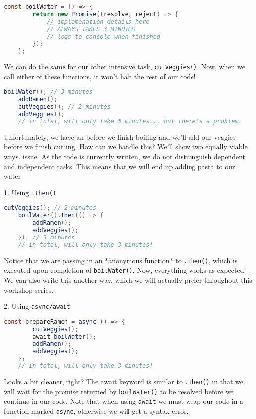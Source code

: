 \begin{lstlisting}[language=Java] 
    const boilWater = () => {
        return new Promise((resolve, reject) => {
            // implemenation details here
            // ALWAYS TAKES 3 MINUTES
            // logs to console when finished
        });        
    };
\end{lstlisting}

We can do the same for our other intensive task, \texttt{cutVeggies()}. Now, when we call either of these functions, it won't halt the rest of our code!

\begin{lstlisting}[language=Java] 
    boilWater(); // 3 minutes
    addRamen();
    cutVeggies(); // 2 minutes
    addVeggies();
    // in total, will only take 3 minutes... but there's a problem.
\end{lstlisting}

Unfortunately, we have an before we finish boiling and we'll add our veggies before we finish cutting. How can we handle this? We'll show two equally viable ways. issue. As the code is currently written, we do not distuinguish dependent and independent tasks. This means that we will end up adding pasta to our water


1. Using \texttt{.then()}
\begin{lstlisting}[language=Java] 
    cutVeggies(); // 2 minutes
    boilWater().then(() => {
        addRamen();
        addVeggies();
    }); // 3 minutes
    // in total, will only take 3 minutes!
\end{lstlisting}

Notice that we are passing in an *anonymous function* to \texttt{.then()}, which is executed upon completion of \texttt{boilWater()}. Now, everything works as expected. We can also write this another way, which we will actually prefer throughout this workshop series.
    
2. Using \texttt{async/await}
\begin{lstlisting}[language=Java] 
    const prepareRamen = async () => {
        cutVeggies();
        await boilWater();
        addRamen();
        addVeggies();
    };
    // in total, will only take 3 minutes!
\end{lstlisting}

Looks a bit cleaner, right? The await keyword is similar to \texttt{.then()} in that we will wait for the promise returned by \texttt{boilWater()} to be resolved before we continue in our code. Note that when using \texttt{await} we must wrap our code in a function marked \texttt{async}, otherwise we will get a syntax error. 

